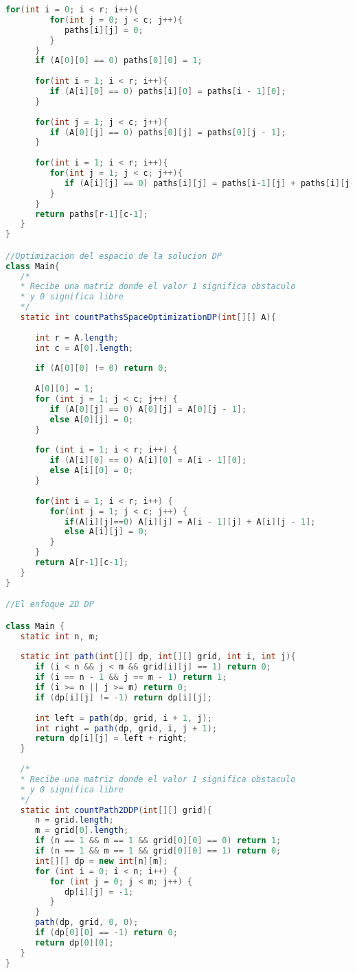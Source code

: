 \begin{lstlisting}[language=Java]
      for(int i = 0; i < r; i++){
         for(int j = 0; j < c; j++){
            paths[i][j] = 0;
         }
      }
      if (A[0][0] == 0) paths[0][0] = 1;
		
      for(int i = 1; i < r; i++){
         if (A[i][0] == 0) paths[i][0] = paths[i - 1][0];
      }
		
      for(int j = 1; j < c; j++){
         if (A[0][j] == 0) paths[0][j] = paths[0][j - 1];
      }
		
      for(int i = 1; i < r; i++){
         for(int j = 1; j < c; j++){
            if (A[i][j] == 0) paths[i][j] = paths[i-1][j] + paths[i][j-1];
         }
      }
      return paths[r-1][c-1];
   }
}

//Optimizacion del espacio de la solucion DP
class Main{
   /*
   * Recibe una matriz donde el valor 1 significa obstaculo
   * y 0 significa libre
   */	
   static int countPathsSpaceOptimizationDP(int[][] A){
		
      int r = A.length;
      int c = A[0].length;
		
      if (A[0][0] != 0) return 0;
      
      A[0][0] = 1;
      for (int j = 1; j < c; j++) {
         if (A[0][j] == 0) A[0][j] = A[0][j - 1];
         else A[0][j] = 0;
      }
      
      for (int i = 1; i < r; i++) {
         if (A[i][0] == 0) A[i][0] = A[i - 1][0];
	     else A[i][0] = 0;
      }
		
      for(int i = 1; i < r; i++) {
         for(int j = 1; j < c; j++) {
            if(A[i][j]==0) A[i][j] = A[i - 1][j] + A[i][j - 1];
            else A[i][j] = 0;
         }
      }
      return A[r-1][c-1];
   }
}

//El enfoque 2D DP

class Main {
   static int n, m;
	
   static int path(int[][] dp, int[][] grid, int i, int j){
      if (i < n && j < m && grid[i][j] == 1) return 0;
      if (i == n - 1 && j == m - 1) return 1;
      if (i >= n || j >= m) return 0;
      if (dp[i][j] != -1) return dp[i][j];
      
      int left = path(dp, grid, i + 1, j);
      int right = path(dp, grid, i, j + 1);
      return dp[i][j] = left + right;
   }
   
   /*
   * Recibe una matriz donde el valor 1 significa obstaculo
   * y 0 significa libre
   */	
   static int countPath2DDP(int[][] grid){
      n = grid.length;
      m = grid[0].length;
      if (n == 1 && m == 1 && grid[0][0] == 0) return 1;
      if (n == 1 && m == 1 && grid[0][0] == 1) return 0;
      int[][] dp = new int[n][m];
      for (int i = 0; i < n; i++) {
         for (int j = 0; j < m; j++) {
            dp[i][j] = -1;
         }
      }
      path(dp, grid, 0, 0);
      if (dp[0][0] == -1) return 0;
      return dp[0][0];
   }
}
	
\end{lstlisting}